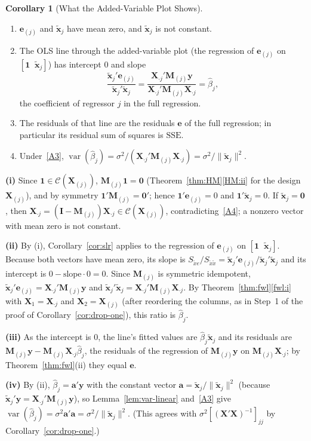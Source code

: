 \documentclass[12pt,a4paper]{article}
\makeatletter
\theoremstyle{definition}
\newtheorem{corollary}[theorem]{Corollary}
\renewenvironment{proof}[1][\proofname]{\par
  \pushQED{\qed}%
  \normalfont \topsep6\p@\@plus6\p@\relax
  \trivlist
  \item[\hskip\labelsep\bfseries #1\@addpunct{.}]\ignorespaces
}{%
  \popQED\endtrivlist\@endpefalse
}
\DeclareMathOperator\var{var}
\newcommand{\SSE}{\mathrm{SSE}}
\newcommand{\bX}{\mathbf{X}}
\newcommand{\by}{\mathbf{y}}
\newcommand{\bx}{\mathbf{x}}
\newcommand{\bI}{\mathbf{I}}
\newcommand{\bM}{\mathbf{M}}
\newcommand{\bone}{\mathbf{1}}
\newcommand{\bzero}{\mathbf{0}}
\newcommand{\ba}{\mathbf{a}}
\newcommand{\calC}{\mathcal{C}}
\makeatother
\begin{document}
\begin{corollary}[What the Added-Variable Plot Shows]\label{cor:avp}
\leavevmode
\begin{enumerate}[label=\textup{(\roman*)}]
\item\label{avp:i} $\mathbf{e}_{(j)}$ and $\tilde{\bx}_j$ have mean zero, and $\tilde{\bx}_j$ is not constant.
\item\label{avp:ii} The OLS line through the added-variable plot (the regression of $\mathbf{e}_{(j)}$ on $[\bone \;\; \tilde{\bx}_j]$) has intercept $0$ and slope
\[
\frac{\tilde{\bx}_j'\mathbf{e}_{(j)}}{\tilde{\bx}_j'\tilde{\bx}_j} = \frac{\bX_{\cdot j}'\bM_{(j)}\by}{\bX_{\cdot j}'\bM_{(j)}\bX_{\cdot j}} = \hat\beta_j,
\]
the coefficient of regressor $j$ in the full regression.
\item The residuals of that line are the residuals $\mathbf{e}$ of the full regression; in particular its residual sum of squares is $\SSE$.
\item\label{avp:iv} Under~\ref{A3}, $\var(\hat\beta_j) = \sigma^2/(\bX_{\cdot j}'\bM_{(j)}\bX_{\cdot j}) = \sigma^2/\|\tilde{\bx}_j\|^2$.
\end{enumerate}
\end{corollary}

\begin{proof}
\textbf{(i)} Since $\bone \in \calC(\bX_{(j)})$, $\bM_{(j)}\bone = \bzero$ (Theorem~\ref{thm:HM}\ref{HM:ii} for the design $\bX_{(j)}$), and by symmetry $\bone'\bM_{(j)} = \bzero'$; hence $\bone'\mathbf{e}_{(j)} = 0$ and $\bone'\tilde{\bx}_j = 0$. If $\tilde{\bx}_j = \bzero$, then $\bX_{\cdot j} = (\bI - \bM_{(j)})\bX_{\cdot j} \in \calC(\bX_{(j)})$, contradicting~\ref{A4}; a nonzero vector with mean zero is not constant.

\textbf{(ii)} By (i), Corollary~\ref{cor:slr} applies to the regression of $\mathbf{e}_{(j)}$ on $[\bone \;\; \tilde{\bx}_j]$. Because both vectors have mean zero, its slope is $S_{\tilde x e}/S_{\tilde x\tilde x} = \tilde{\bx}_j'\mathbf{e}_{(j)}/\tilde{\bx}_j'\tilde{\bx}_j$ and its intercept is $0 - \text{slope}\cdot 0 = 0$. Since $\bM_{(j)}$ is symmetric idempotent, $\tilde{\bx}_j'\mathbf{e}_{(j)} = \bX_{\cdot j}'\bM_{(j)}\by$ and $\tilde{\bx}_j'\tilde{\bx}_j = \bX_{\cdot j}'\bM_{(j)}\bX_{\cdot j}$. By Theorem~\ref{thm:fwl}\ref{fwl:i} with $\bX_1 = \bX_{\cdot j}$ and $\bX_2 = \bX_{(j)}$ (after reordering the columns, as in Step~1 of the proof of Corollary~\ref{cor:drop-one}), this ratio is $\hat\beta_j$.

\textbf{(iii)} As the intercept is $0$, the line's fitted values are $\hat\beta_j\tilde{\bx}_j$ and its residuals are $\bM_{(j)}\by - \bM_{(j)}\bX_{\cdot j}\hat\beta_j$, the residuals of the regression of $\bM_{(j)}\by$ on $\bM_{(j)}\bX_{\cdot j}$; by Theorem~\ref{thm:fwl}(ii) they equal $\mathbf{e}$.

\textbf{(iv)} By (ii), $\hat\beta_j = \ba'\by$ with the constant vector $\ba = \tilde{\bx}_j/\|\tilde{\bx}_j\|^2$ (because $\tilde{\bx}_j'\by = \bX_{\cdot j}'\bM_{(j)}\by$), so Lemma~\ref{lem:var-linear} and~\ref{A3} give $\var(\hat\beta_j) = \sigma^2\ba'\ba = \sigma^2/\|\tilde{\bx}_j\|^2$. (This agrees with $\sigma^2[(\bX'\bX)^{-1}]_{jj}$ by Corollary~\ref{cor:drop-one}.)
\end{proof}
\end{document}
